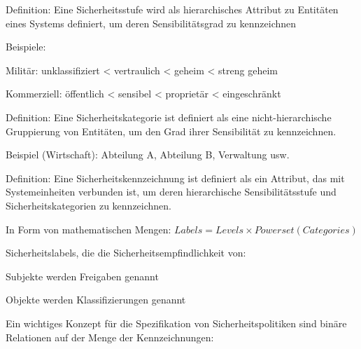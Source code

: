 \documentclass[a4paper]{article}
\begin{document}
\begin{multicols}{3}
      \begin{itemize*}
            \item Definition: Eine Sicherheitsstufe wird als hierarchisches Attribut zu
            Entitäten eines Systems definiert, um deren Sensibilitätsgrad zu
            kennzeichnen
            \begin{itemize*}
                  \item Beispiele:
                  \begin{itemize*} \item Militär: unklassifiziert < vertraulich < geheim < streng geheim \item Kommerziell: öffentlich < sensibel < proprietär < eingeschränkt \end{itemize*}
            \end{itemize*}
            \item Definition: Eine Sicherheitskategorie ist definiert als eine
            nicht-hierarchische Gruppierung von Entitäten, um den Grad ihrer
            Sensibilität zu kennzeichnen.
            \begin{itemize*}
                  \item Beispiel (Wirtschaft): Abteilung A, Abteilung B, Verwaltung usw.
            \end{itemize*}
            \item Definition: Eine Sicherheitskennzeichnung ist definiert als ein
            Attribut, das mit Systemeinheiten verbunden ist, um deren
            hierarchische Sensibilitätsstufe und Sicherheitskategorien zu
            kennzeichnen.
            \begin{itemize*}
                  \item In Form von mathematischen Mengen: $Labels = Levels \times Powerset(Categories)$
            \end{itemize*}
            \item Sicherheitslabels, die die Sicherheitsempfindlichkeit von:
            \begin{itemize*}
                  \item Subjekte werden Freigaben genannt
                  \item Objekte werden Klassifizierungen genannt
            \end{itemize*}
            \item Ein wichtiges Konzept für die Spezifikation von Sicherheitspolitiken
            sind binäre Relationen auf der Menge der Kennzeichnungen:
            \begin{itemize*}

\end{itemize*}
\end{itemize*}
\end{multicols}
\end{document}
